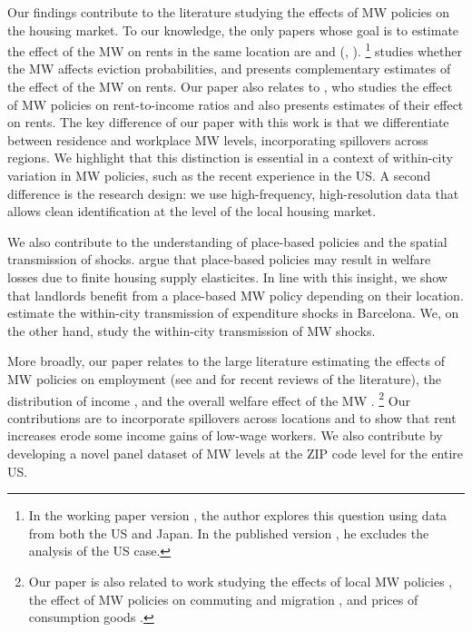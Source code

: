 Our findings contribute to the literature studying the effects of MW policies 
on the housing market.
To our knowledge, the only papers whose goal is to estimate the effect of the 
MW on rents in the same location are \textcite{Tidemann2018} and 
\citeauthor{Yamagishi2019} (\cite*{Yamagishi2019}, \cite*{Yamagishi2021}).%
\footnote{In the working paper version \parencite{Yamagishi2019}, the author 
	explores this question using data from both the US and Japan.
	In the published version \parencite{Yamagishi2021}, he excludes the analysis 
	of the US case.}
\textcite{AgarwalEtAl2022} studies whether the MW affects eviction 
probabilities, and presents complementary estimates of the effect of the MW on 
rents.
Our paper also relates to \textcite{Hughes2020}, who studies the effect of 
MW policies on rent-to-income ratios and also presents estimates of their 
effect on rents.
The key difference of our paper with this work is that we differentiate 
between residence and workplace MW levels, incorporating spillovers across 
regions.
We highlight that this distinction is essential in a context of within-city
variation in MW policies, such as the recent experience in the US.
A second difference is the research design: we use high-frequency,
high-resolution data that allows clean identification at the level of the 
local housing market.

We also contribute to the understanding of place-based policies and the spatial 
transmission of shocks.
\textcite{KlineMoretti2014} argue that place-based policies may result in 
welfare losses due to finite housing supply elasticites.
In line with this insight, we show that landlords benefit from a 
place-based MW policy depending on their location.
\textcite{AllenEtAl2020} estimate the within-city transmission of expenditure 
shocks in Barcelona.
We, on the other hand, study the within-city transmission of MW shocks.

More broadly, our paper relates to the large literature estimating the effects
of MW policies on employment
(see \cite{Dube2019} and \cite{NeumarkShirley2021} for recent reviews of the 
literature), 
the distribution of income \parencite[e.g.,][]{Lee1999, AutorEtAl2016, 
	Dube2019Income}, 
and the overall welfare effect of the MW \parencite{AhlfeldtEtAl2022,
	BergerHerkenhoffMongey2022}.%
\footnote{Our paper is also related to work studying 
	the effects of local MW policies 
	\parencite[e.g.,][]{DubeLindner2021, JardimEtAl2022seattle}, 
	the effect of MW policies on commuting and migration 
	\parencite[e.g.,][]{Cadena2014, Monras2019, PerezPerez2021}, 
	and prices of consumption goods 
	\parencite[e.g.,][]{Aaronson2001, AllegrettoReich2018, Leung2021}.} %
Our contributions are to incorporate spillovers across locations 
\parencite[as in the recent work by][]{JardimEtAl2022discontinuity} and to show 
that rent increases erode some income gains of low-wage workers.
We also contribute by developing a novel panel dataset of MW levels at the 
ZIP code level for the entire US.

